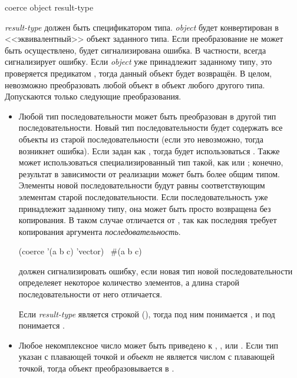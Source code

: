 \begin{defun}[Функция]
coerce object result-type

\emph{result-type} должен быть спецификатором типа. \emph{object} будет
конвертирован в <<эквивалентный>> объект заданного типа.
Если преобразование не может быть осуществлено, будет сигнализирована ошибка.
В частности,  всегда сигнализирует ошибку.
Если \emph{object} уже принадлежит заданному типу, это проверяется предикатом
, тогда данный объект будет возвращён.
В целом, невозможно преобразовать любой объект в объект любого другого
типа. Допускаются только следующие преобразования.
\begin{itemize}
\item
  Любой тип последовательности может быть преобразован в другой тип
  последовательности. Новый тип последовательности будет содержать все
  объекты из старой последовательности (если это невозможно, тогда возникнет
  ошибка). Если  задан как , тогда будет использоваться
  . Также может использоваться специализированный тип такой, как
   или ; конечно, результат в
  зависимости от реализации может быть более общим типом.
  Элементы новой последовательности будут равны  соответствующим
  элементам старой последовательности.
  Если последовательность уже принадлежит заданному типу, она может быть просто
  возвращена без копирования. В таком случае  отличается от , так как последняя требует
  копирования аргумента \emph{последовательность}.

  \begin{lisp}
    (coerce '(a b c) 'vector) \EV\ \#(a b c)
  \end{lisp}

 должен сигнализировать ошибку, если новая тип новой
последовательности определеяет некоторое количество элементов, а длина старой
последовательности от него отличается.

Если \emph{result-type} является строкой (), тогда под ним
понимается , и под  понимается
.

\item
  Любое некомплексное число может быть приведено к ,
  ,  или . Если тип указан с
  плавающей точкой и \emph{объект} не является числом с плавающей точкой, тогда
  объект преобразовывается в .


\end{itemize}
\end{defun}
